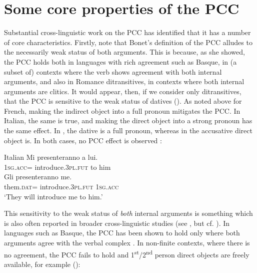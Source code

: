 \documentclass[output=paper,colorlinks,citecolor=brown,nonflat]{langsci/langscibook}
\begin{document}
\section{Some core properties of the PCC}\label{sec:sheehan:2}

Substantial cross-linguistic work on the PCC has identified that it has a number of core characteristics. Firstly, note that Bonet’s definition of the PCC alludes to the necessarily weak status of both arguments. This is because, as she showed, the PCC holds both in languages with rich agreement such as Basque, in (a subset of) contexts where the verb shows agreement with both internal arguments, and also in Romance ditransitives, in contexts where both internal arguments are clitics. It would appear, then, if we consider only ditransitives, that the PCC is sensitive to the weak status of datives (\citealt{Bonet1991, Anagnostopoulou2005, Bianchi2006, Stegovec2017}). As noted above for French, making the indirect object into a full pronoun mitigates the PCC. In Italian, the same is true, and making the direct object into a strong pronoun has the same effect. In , the dative is a full pronoun, whereas in  the accusative direct object is. In both cases, no PCC effect is observed \citep{Bianchi2006}:

\ea%
    \label{ex:sheehan:9}
    Italian \citep[2041]{Bianchi2006}
    \ea\label{ex:sheehan:9a}
    \gll    Mi   presenteranno       a  lui.\\
            \textsc{1sg}.\textsc{acc}=  introduce.\textsc{3pl}.\textsc{fut}   to   him\\
    \ex\label{ex:sheehan:9b}
    \gll    Gli     presenteranno       me.\\
            them.\textsc{dat=}  introduce.\textsc{3pl}.\textsc{fut} \textsc{1sg}.\textsc{acc}\\
    \glt    ‘They will introduce me to him.’
    \z
\z

This sensitivity to the weak status of \textit{both} internal arguments is something which is also often reported in broader cross-linguistic studies (see \citealt{Stegovec2017}, but cf. \citealt{OrmazabalRomero2007}). In languages such as Basque, the PCC has been shown to hold only where both arguments agree with the verbal complex \citep{Laka1996}. In non-finite contexts, where there is no agreement, the PCC fails to hold and 1\textsuperscript{st}/2\textsuperscript{nd} person direct objects are freely available, for example (\citealt{Laka1996, Preminger2019}):
\end{document}
